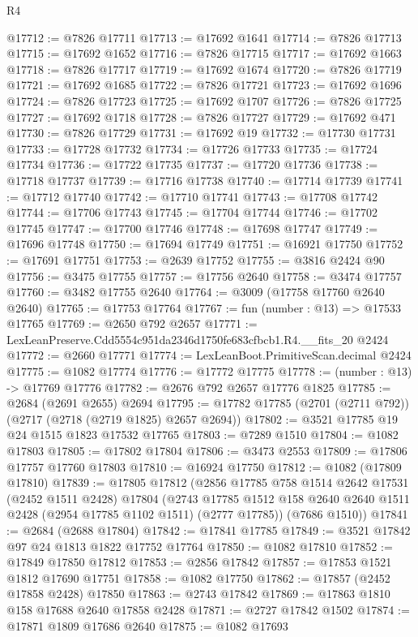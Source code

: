 \begin{lexlean}{R4}
\begin{coremodule}
@17712 := @7826 @17711
@17713 := @17692 @1641
@17714 := @7826 @17713
@17715 := @17692 @1652
@17716 := @7826 @17715
@17717 := @17692 @1663
@17718 := @7826 @17717
@17719 := @17692 @1674
@17720 := @7826 @17719
@17721 := @17692 @1685
@17722 := @7826 @17721
@17723 := @17692 @1696
@17724 := @7826 @17723
@17725 := @17692 @1707
@17726 := @7826 @17725
@17727 := @17692 @1718
@17728 := @7826 @17727
@17729 := @17692 @471
@17730 := @7826 @17729
@17731 := @17692 @19
@17732 := @17730 @17731
@17733 := @17728 @17732
@17734 := @17726 @17733
@17735 := @17724 @17734
@17736 := @17722 @17735
@17737 := @17720 @17736
@17738 := @17718 @17737
@17739 := @17716 @17738
@17740 := @17714 @17739
@17741 := @17712 @17740
@17742 := @17710 @17741
@17743 := @17708 @17742
@17744 := @17706 @17743
@17745 := @17704 @17744
@17746 := @17702 @17745
@17747 := @17700 @17746
@17748 := @17698 @17747
@17749 := @17696 @17748
@17750 := @17694 @17749
@17751 := @16921 @17750
@17752 := @17691 @17751
@17753 := @2639 @17752
@17755 := @3816 @2424 @90
@17756 := @3475 @17755
@17757 := @17756 @2640
@17758 := @3474 @17757
@17760 := @3482 @17755 @2640
@17764 := @3009 (@17758 @17760 @2640 @2640)
@17765 := @17753 @17764
@17767 := fun (number : @13) => @17533 @17765
@17769 := @2650 @792 @2657
@17771 := LexLeanPreserve.Cdd5554c951da2346d1750fe683cfbcb1.R4.__fits_20 @2424
@17772 := @2660 @17771
@17774 := LexLeanBoot.PrimitiveScan.decimal @2424
@17775 := @1082 @17774
@17776 := @17772 @17775
@17778 := (number : @13) -> @17769 @17776
@17782 := @2676 @792 @2657 @17776 @1825
@17785 := @2684 (@2691 @2655) @2694
@17795 := @17782 @17785 (@2701 (@2711 @792)) (@2717 (@2718 (@2719 @1825) @2657 @2694))
@17802 := @3521 @17785 @19 @24 @1515 @1823 @17532 @17765
@17803 := @7289 @1510
@17804 := @1082 @17803
@17805 := @17802 @17804
@17806 := @3473 @2553
@17809 := @17806 @17757 @17760 @17803
@17810 := @16924 @17750
@17812 := @1082 (@17809 @17810)
@17839 := @17805
    @17812
    (@2856
      @17785
      @758
      @1514
      @2642
      @17531
      (@2452 @1511 @2428)
      @17804
      (@2743 @17785 @1512 @158 @2640 @2640 @1511 @2428 (@2954 @17785 @1102 @1511) (@2777 @17785))
      (@7686 @1510))
@17841 := @2684 (@2688 @17804)
@17842 := @17841 @17785
@17849 := @3521 @17842 @97 @24 @1813 @1822 @17752 @17764
@17850 := @1082 @17810
@17852 := @17849 @17850 @17812
@17853 := @2856 @17842
@17857 := @17853 @1521 @1812 @17690 @17751
@17858 := @1082 @17750
@17862 := @17857 (@2452 @17858 @2428) @17850
@17863 := @2743 @17842
@17869 := @17863 @1810 @158 @17688 @2640 @17858 @2428
@17871 := @2727 @17842 @1502
@17874 := @17871 @1809 @17686 @2640
@17875 := @1082 @17693

\end{coremodule}
\end{lexlean}
